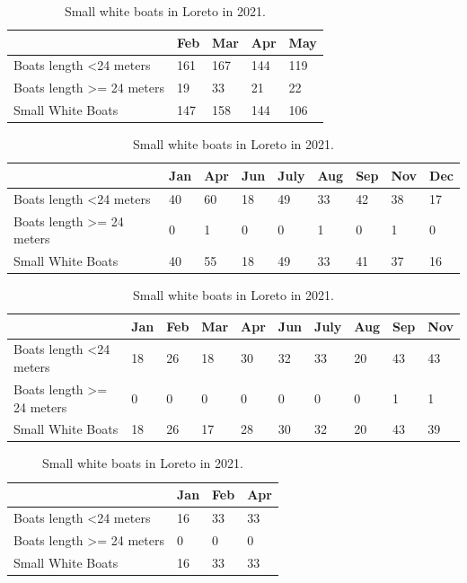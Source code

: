 \begin{table}[p]
\begin{tabular}{|l|l|l|l|l|}
\hline
                                       & Feb & Mar & Apr & May \\ \hline
Boats length \textless 24 meters       & 161 & 167 & 144 & 119 \\ \hline
Boats length \textgreater{}= 24 meters & 19  & 33  & 21  & 22  \\ \hline
Small White Boats                      & 147 & 158 & 144 & 106 \\ \hline
\end{tabular}
\caption{Small white boats in Guaymas in 2021.}

\begin{tabular}{|l|l|l|l|l|l|l|l|l|}
\hline
                                       & Jan & Apr & Jun & July & Aug & Sep & Nov & Dec \\ \hline
Boats length \textless 24 meters       & 40  & 60  & 18  & 49   & 33  & 42  & 38  & 17  \\ \hline
Boats length \textgreater{}= 24 meters & 0   & 1   & 0   & 0    & 1   & 0   & 1   & 0   \\ \hline
Small White Boats                      & 40  & 55  & 18  & 49   & 33  & 41  & 37  & 16  \\ \hline
\end{tabular}
\caption{Small white boats in Loreto in 2019.}


\begin{tabular}{|l|l|l|l|l|l|l|l|l|l|}
\hline
                                       & Jan & Feb & Mar & Apr & Jun & July & Aug & Sep & Nov \\ \hline
Boats length \textless 24 meters       & 18  & 26  & 18  & 30  & 32  & 33   & 20  & 43  & 43  \\ \hline
Boats length \textgreater{}= 24 meters & 0   & 0   & 0   & 0   & 0   & 0    & 0   & 1   & 1   \\ \hline
Small White Boats                      & 18  & 26  & 17  & 28  & 30  & 32   & 20  & 43  & 39  \\ \hline
\end{tabular}
\caption{Small white boats in Loreto 2020.}


\begin{tabular}{|l|l|l|l|}
\hline
                                       & Jan & Feb & Apr \\ \hline
Boats length \textless 24 meters       & 16  & 33  & 33  \\ \hline
Boats length \textgreater{}= 24 meters & 0   & 0   & 0   \\ \hline
Small White Boats                      & 16  & 33  & 33  \\ \hline
\end{tabular}
\caption{Small white boats in Loreto in 2021.}


\end{table}

